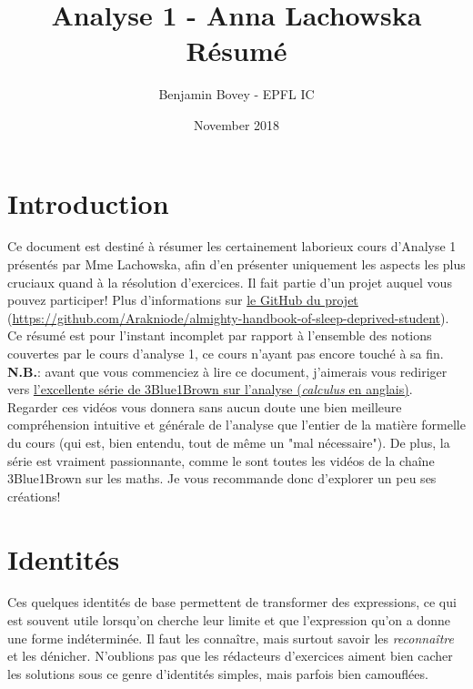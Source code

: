 \documentclass{article}
\title{Analyse 1 -  Anna Lachowska \\ Résumé}
\author{Benjamin Bovey - EPFL IC}
\date{November 2018}
\begin{document}
\maketitle

\section*{Introduction}
Ce document est destiné à résumer les certainement laborieux cours d'Analyse 1 présentés par Mme Lachowska, afin d'en présenter uniquement les aspects les plus cruciaux quand à la résolution d'exercices. Il fait partie d'un projet auquel vous pouvez participer! Plus d'informations sur \href{https://github.com/Arakniode/almighty-handbook-of-sleep-deprived-student}{le GitHub du projet} (\url{https://github.com/Arakniode/almighty-handbook-of-sleep-deprived-student}). \\
Ce résumé est pour l'instant incomplet par rapport à l'ensemble des notions couvertes par le cours d'analyse 1, ce cours n'ayant pas encore touché à sa fin. \\

\textbf{N.B.}: avant que vous commenciez à lire ce document, j'aimerais vous rediriger vers \href{https://www.youtube.com/playlist?list=PLZHQObOWTQDMsr9K-rj53DwVRMYO3t5Yr}{l'excellente série de 3Blue1Brown sur l'analyse (\emph{calculus} en anglais)}. Regarder ces vidéos vous donnera sans aucun doute une bien meilleure compréhension intuitive et générale de l'analyse que l'entier de la matière formelle du cours (qui est, bien entendu, tout de même un "mal nécessaire"). De plus, la série est vraiment passionnante, comme le sont toutes les vidéos de la chaîne 3Blue1Brown sur les maths. Je vous recommande donc d'explorer un peu ses créations!


\section{Identités}
Ces quelques identités de base permettent de transformer des expressions, ce qui est souvent utile lorsqu'on cherche leur limite et que l'expression qu'on a donne une forme indéterminée. Il faut les connaître, mais surtout savoir les \emph{reconnaître} et les dénicher. N'oublions pas que les rédacteurs d'exercices aiment bien cacher les solutions sous ce genre d'identités simples, mais parfois bien camouflées.
\end{document}
